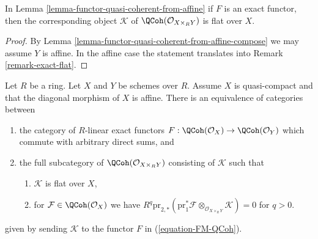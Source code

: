 \begin{lemma}
\label{lemma-coh-noetherian-from-affine-flat}
In Lemma \ref{lemma-functor-quasi-coherent-from-affine}
if $F$ is an exact functor, then the corresponding object
$\mathcal{K}$ of $\QCoh(\mathcal{O}_{X \times_R Y})$ is flat over $X$.
\end{lemma}

\begin{proof}
By Lemma \ref{lemma-functor-quasi-coherent-from-affine-compose}
we may assume $Y$ is affine. In the affine case the statement
translates into Remark \ref{remark-exact-flat}.
\end{proof}

\begin{lemma}
\label{lemma-functor-quasi-coherent-from-affine-diagonal}
Let $R$ be a ring. Let $X$ and $Y$ be schemes over $R$. Assume $X$ is
quasi-compact and that the diagonal morphism of $X$ is affine.
There is an equivalence of categories between
\begin{enumerate}
\item the category of $R$-linear exact functors
$F : \QCoh(\mathcal{O}_X) \to \QCoh(\mathcal{O}_Y)$
which commute with arbitrary direct sums, and
\item the full subcategory of $\QCoh(\mathcal{O}_{X \times_R Y})$ consisting
of $\mathcal{K}$ such that
\begin{enumerate}
\item $\mathcal{K}$ is flat over $X$,
\item for $\mathcal{F} \in \QCoh(\mathcal{O}_X)$ we have
$R^q\text{pr}_{2, *}(\text{pr}_1^*\mathcal{F}
\otimes_{\mathcal{O}_{X \times_R Y}} \mathcal{K}) = 0$ for $q > 0$.
\end{enumerate}
\end{enumerate}
given by sending $\mathcal{K}$ to the functor $F$ in (\ref{equation-FM-QCoh}).
\end{lemma}

